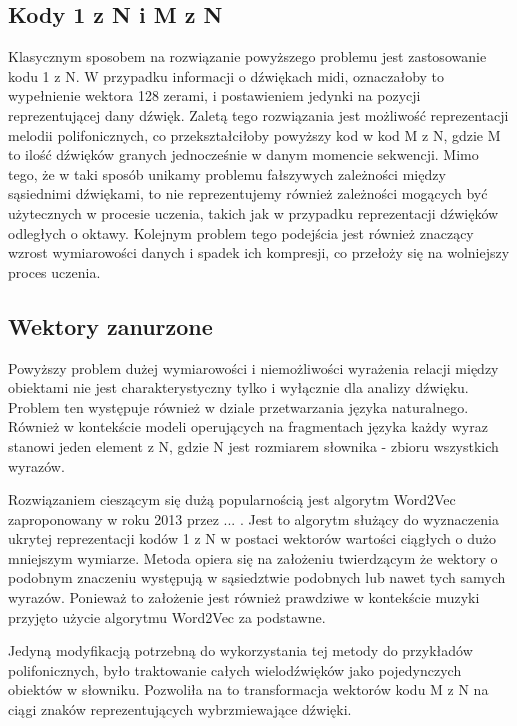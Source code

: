 {{        \subsection{Kody 1 z N i M z N}
        {
            Klasycznym sposobem na rozwiązanie powyższego problemu jest zastosowanie kodu 1 z N. W przypadku
            informacji o dźwiękach midi, oznaczałoby to wypełnienie wektora 128 zerami, i postawieniem jedynki na 
            pozycji reprezentującej dany dźwięk. 
            Zaletą tego rozwiązania jest możliwość reprezentacji melodii polifonicznych, co przekształciłoby
            powyższy kod w kod M z N, gdzie M to ilość dźwięków granych jednocześnie w danym momencie sekwencji.
            Mimo tego, że w taki sposób unikamy problemu fałszywych zależności między sąsiednimi dźwiękami, 
            to nie reprezentujemy również zależności mogących być użytecznych w procesie uczenia, 
            takich jak w przypadku reprezentacji dźwięków odległych o oktawy. 
            Kolejnym problem tego podejścia jest również znaczący wzrost wymiarowości danych i spadek ich kompresji,
            co przełoży się na wolniejszy proces uczenia.
        }

        \subsection{Wektory zanurzone}
        {
            Powyższy problem dużej wymiarowości i niemożliwości wyrażenia relacji między obiektami nie jest
            charakterystyczny tylko i wyłącznie dla analizy dźwięku. Problem ten występuje również w dziale
            przetwarzania języka naturalnego. Również w kontekście modeli operujących na fragmentach języka każdy wyraz stanowi
            jeden element z N, gdzie N jest rozmiarem słownika - zbioru wszystkich wyrazów.

            Rozwiązaniem cieszącym się dużą popularnością jest algorytm Word2Vec zaproponowany w roku 2013 przez ... .
            Jest to algorytm służący do wyznaczenia ukrytej reprezentacji kodów 1 z N w postaci wektorów wartości ciągłych
            o dużo mniejszym wymiarze. Metoda opiera się na założeniu twierdzącym że wektory 
            o podobnym znaczeniu występują w sąsiedztwie podobnych lub nawet tych samych wyrazów. Ponieważ to założenie 
            jest również prawdziwe w kontekście muzyki przyjęto użycie algorytmu Word2Vec za podstawne.
            
            Jedyną modyfikacją potrzebną do wykorzystania tej metody do przykładów polifonicznych, było traktowanie 
            całych wielodźwięków jako pojedynczych obiektów w słowniku. Pozwoliła na to transformacja wektorów kodu 
            M z N na ciągi znaków reprezentujących wybrzmiewające dźwięki.
        }
    }

}
